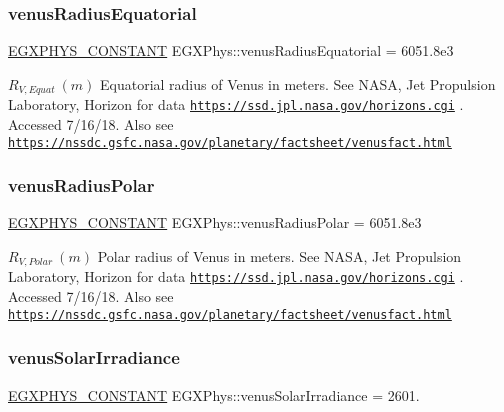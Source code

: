\subsubsection{\texorpdfstring{venus\+Radius\+Equatorial}{venusRadiusEquatorial}}
{\footnotesize\ttfamily \mbox{\hyperlink{group___e_g_x_phys-_constants-_macros_ga76980d288494ce1714c9ac68a95ba702}{E\+G\+X\+P\+H\+Y\+S\+\_\+\+C\+O\+N\+S\+T\+A\+NT}} E\+G\+X\+Phys\+::venus\+Radius\+Equatorial = 6051.\+8e3}

$R_{V,Equat} \ (m)$ Equatorial radius of Venus in meters. See N\+A\+SA, Jet Propulsion Laboratory, Horizon for data \href{https://ssd.jpl.nasa.gov/horizons.cgi}{\tt https\+://ssd.\+jpl.\+nasa.\+gov/horizons.\+cgi} . Accessed 7/16/18. Also see \href{https://nssdc.gsfc.nasa.gov/planetary/factsheet/venusfact.html}{\tt https\+://nssdc.\+gsfc.\+nasa.\+gov/planetary/factsheet/venusfact.\+html} \mbox{\label{group___e_g_x_phys-_constants-_astrophysics-_solar_system-_venus-_bulk_gaa2e9fd69a5627d4eb46749d8245bf9c0}} 
\subsubsection{\texorpdfstring{venus\+Radius\+Polar}{venusRadiusPolar}}
{\footnotesize\ttfamily \mbox{\hyperlink{group___e_g_x_phys-_constants-_macros_ga76980d288494ce1714c9ac68a95ba702}{E\+G\+X\+P\+H\+Y\+S\+\_\+\+C\+O\+N\+S\+T\+A\+NT}} E\+G\+X\+Phys\+::venus\+Radius\+Polar = 6051.\+8e3}

$R_{V,Polar} \ (m)$ Polar radius of Venus in meters. See N\+A\+SA, Jet Propulsion Laboratory, Horizon for data \href{https://ssd.jpl.nasa.gov/horizons.cgi}{\tt https\+://ssd.\+jpl.\+nasa.\+gov/horizons.\+cgi} . Accessed 7/16/18. Also see \href{https://nssdc.gsfc.nasa.gov/planetary/factsheet/venusfact.html}{\tt https\+://nssdc.\+gsfc.\+nasa.\+gov/planetary/factsheet/venusfact.\+html} \mbox{\label{group___e_g_x_phys-_constants-_astrophysics-_solar_system-_venus-_bulk_ga9c4ac12c5a1974a8d2b2308db550aaa3}} 
\subsubsection{\texorpdfstring{venus\+Solar\+Irradiance}{venusSolarIrradiance}}
{\footnotesize\ttfamily \mbox{\hyperlink{group___e_g_x_phys-_constants-_macros_ga76980d288494ce1714c9ac68a95ba702}{E\+G\+X\+P\+H\+Y\+S\+\_\+\+C\+O\+N\+S\+T\+A\+NT}} E\+G\+X\+Phys\+::venus\+Solar\+Irradiance = 2601.}

